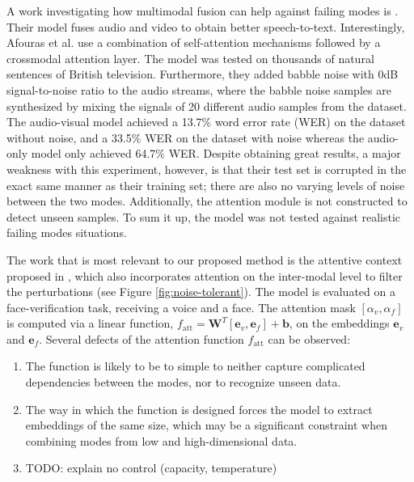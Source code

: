 \begin{figure}[!ht]
\label{fig:looking-to-listen}
\end{figure}

A work investigating how multimodal fusion can help against failing modes is \citep{afouras}. Their model fuses audio and video to obtain better speech-to-text. Interestingly, Afouras et al. use a combination of self-attention mechanisms followed by a crossmodal attention layer. The model was tested on thousands of natural sentences of British television. Furthermore, they added babble noise with 0dB signal-to-noise ratio to the audio streams, where the babble noise samples are synthesized by mixing the signals of 20 different audio samples from the dataset. The audio-visual model achieved a 13.7\% word error rate (WER) on the dataset without noise, and a 33.5\% WER on the dataset with noise whereas the audio-only model only achieved 64.7\% WER. Despite obtaining great results, a major weakness with this experiment, however, is that their test set is corrupted in the exact same manner as their training set; there are also no varying levels of noise between the two modes. Additionally, the attention module is not constructed to detect unseen samples. To sum it up, the model was not tested against realistic failing modes situations.

The work that is most relevant to our proposed method is the attentive context proposed in \citep{audiovisual-attention}, which also incorporates attention on the inter-modal level to filter the perturbations (see Figure \ref{fig:noise-tolerant}). The model is evaluated on a face-verification task, receiving a voice and a face. The attention mask $[\alpha_v,\alpha_f]$ is computed via a linear function, $f_{\text{att}} = \mathbf{W}^T[\mathbf{e}_v, \mathbf{e}_f] + \mathbf{b}$, on the embeddings $\mathbf{e}_v$ and $\mathbf{e}_f$. Several defects of the attention function $f_{\text{att}}$ can be observed: 
\begin{enumerate}
\item The function is likely to be to simple to neither capture complicated dependencies between the modes, nor to recognize unseen data.
\item The way in which the function is designed forces the model to extract embeddings of the same size, which may be a significant constraint when combining modes from low and high-dimensional data.
\item TODO: explain no control (capacity, temperature)
\end{enumerate}

